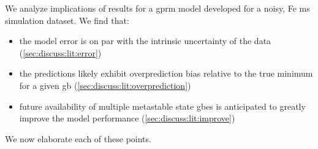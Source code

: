 \documentclass[final,twocolumn,12pt]{elsarticle}
\begin{document}
%	
We analyze implications of results for a \gls{gprm} model developed for a noisy, Fe \gls{ms} simulation dataset.
	We find that:
	\begin{itemize}
		\item the model error is on par with the intrinsic uncertainty of the data (\cref{sec:discuss:lit:error})
		\item the predictions likely exhibit overprediction bias relative to the true minimum for a given \gls{gb} (\cref{sec:discuss:lit:overprediction})
		\item future availability of multiple metastable state \glspl{gbe} is anticipated to greatly improve the model performance (\cref{sec:discuss:lit:improve})
	\end{itemize}
	We now elaborate each of these points.
%	
%	
\end{document}
